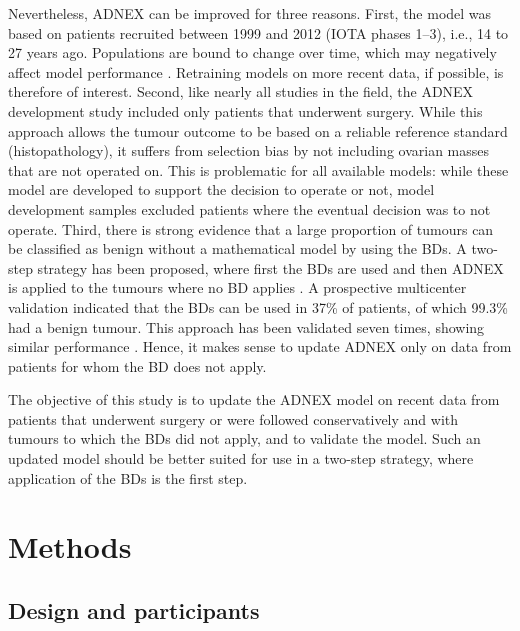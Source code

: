 Nevertheless, \gls{ADNEX} can be improved for three reasons. First, the model was based on patients recruited between 1999 and 2012 (\gls{IOTA} phases 1--3), i.e., 14 to 27 years ago. Populations are bound to change over time, which may negatively affect model performance \cite{vancalsterThereNoSuch2023}. Retraining models on more recent data, if possible, is therefore of interest. Second, like nearly all studies in the field, the \gls{ADNEX} development study included only patients that underwent surgery. While this approach allows the tumour outcome to be based on a reliable reference standard (histopathology), it suffers from selection bias by not including ovarian masses that are not operated on. This is problematic for all available models: while these model are developed to support the decision to operate or not, model development samples excluded patients where the eventual decision was to not operate. Third, there is strong evidence that a large proportion of tumours can be classified as benign without a mathematical model by using the \glspl{BD}. A two-step strategy has been proposed, where first the \glspl{BD} are used and then \gls{ADNEX} is applied to the tumours where no \gls{BD} applies \cite{landolfoBenignDescriptorsADNEX2023}. A prospective multicenter validation indicated that the \glspl{BD} can be used in 37\% of patients, of which 99.3\% had a benign tumour. This approach has been validated seven times, showing similar performance  \cite{barcroftEvaluatingUseTwostep2024,borgesProspectiveExternalValidation2024, devitisDiagnosticAlgorithmsAdnexal2025, einigExternalValidationIOTA2025, pascualValidationADNEXIOTA2024,perryCostConsequenceAnalysis2026, timmermanExternalValidationOvarianAdnexal2023}. Hence, it makes sense to update \gls{ADNEX} only on data from patients for whom the \gls{BD} does not apply.

The objective of this study is to update the \gls{ADNEX} model on recent data from patients that underwent surgery or were followed conservatively and with tumours to which the \glspl{BD} did not apply, and to validate the model. Such an updated model should be better suited for use in a two-step strategy, where application of the \glspl{BD} is the first step.

\section{Methods}

\subsection{Design and participants}

